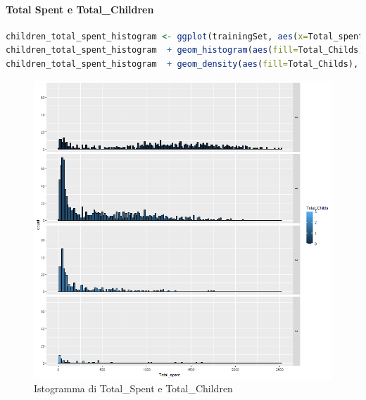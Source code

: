\documentclass[letterpaper,11pt]{article}
\begin{document}
\newpage

\paragraph{Total Spent e Total\_Children}

\begin{lstlisting}[language=R]
children_total_spent_histogram <- ggplot(trainingSet, aes(x=Total_spent)) + facet_grid(Total_Childs~.)
children_total_spent_histogram  + geom_histogram(aes(fill=Total_Childs), binwidth = 15, colour = "Black")
children_total_spent_histogram  + geom_density(aes(fill=Total_Childs), position = "Stack")
\end{lstlisting}


\begin{figure}[h]
  \centering
  \begin{minipage}[b]{0.4\textwidth}
    \includegraphics[width=\textwidth]{Img/EDA/EDA032.png}
    \caption{Istogramma di Total\_Spent e Total\_Children}
    \label{fig:IstogrammaTsTc}
  \end{minipage}
  \hfill
  \begin{minipage}[b]{0.4\textwidth}

\end{minipage}
\end{figure}
\end{document}
